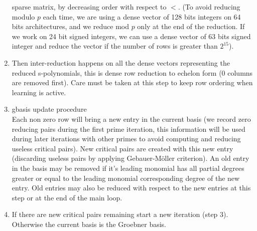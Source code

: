 \documentclass[a4paper,11pt]{article}
\begin{document}
\begin{giacjshere}
\begin{enumerate}
sparse matrix, by decreasing order with respect to $<$.
(To avoid reducing modulo $p$ each time, we are using a dense
vector of 128 bits integers on 64 bits architectures, 
and we reduce mod $p$ only at the end of the reduction. If
we work on 24 bit signed integers, we can use a dense vector 
of 63 bits signed integer and reduce the vector if the number
of rows is greater than $2^{15}$).
\item Then inter-reduction happens on all the dense vectors representing
the reduced s-polynomials, this is dense row
reduction to echelon form (0 columns are removed first). 
Care must be taken at this step
to keep row ordering when learning is active.
\item gbasis update procedure\\
Each non zero row will bring a new entry in the current
basis (we record zero reducing pairs during the first prime iteration,
this information will be used during later iterations with other
primes to avoid computing and reducing
useless critical pairs). 
New critical pairs are created with this new entry (discarding useless
pairs by applying Gebauer-M\"oller criterion).
An old entry in the basis may be removed if it's leading monomial
has all partial degrees greater or equal to the leading monomial
corresponding degree of the new entry.
Old entries may also be reduced with respect to the new entries 
at this step or at the end of the main loop.
\item If there are new critical pairs remaining start a new iteration
  (step 3). Otherwise the current basis is the Groebner basis.
\end{enumerate}


\end{giacjshere}
\end{document}
